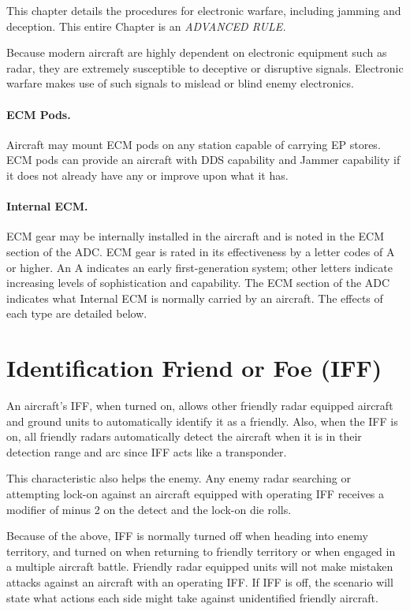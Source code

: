 
This chapter details the procedures for electronic warfare, including jamming and deception. This entire Chapter is an \emph{ADVANCED RULE.}

Because modern aircraft are highly dependent on electronic equipment such as radar, they are extremely susceptible to deceptive or disruptive signals.  Electronic warfare makes use of such signals to mislead or blind enemy electronics.

\paragraph{ECM Pods.} Aircraft may mount ECM pods on any station capable of carrying EP stores. ECM pods can provide an aircraft with DDS capability and Jammer capability if it does not already have any or improve upon what it has.  

\paragraph{Internal ECM.} ECM gear may be internally installed in the aircraft and is noted in the ECM section of the ADC. ECM gear is rated in its effectiveness by a letter codes of A or higher. An A indicates an early first-generation system; other letters indicate increasing levels of sophistication and capability. The ECM section of the ADC indicates what Internal ECM is normally carried by an aircraft. The effects of each type are detailed below.

\section{Identification Friend or Foe (IFF)}
\label{rule:iff}

An aircraft's IFF, when turned on, allows other friendly radar equipped aircraft and ground units to automatically identify it as a friendly. Also, when the IFF is on, all friendly radars automatically detect the aircraft when it is in their detection range and arc since IFF acts like a transponder.

This characteristic also helps the enemy. Any enemy radar searching or attempting lock-on against an aircraft equipped with operating IFF receives a modifier of minus 2 on the detect and the lock-on die rolls.

Because of the above, IFF is normally turned off when heading into enemy territory, and turned on when returning to friendly territory or when engaged in a multiple aircraft battle. Friendly radar equipped units will not make mistaken attacks against an aircraft with an operating IFF. If IFF is off, the scenario will state what actions each side might take against unidentified friendly aircraft.

